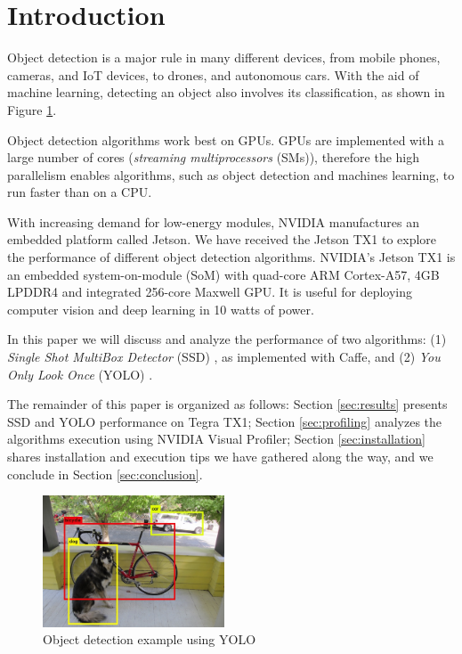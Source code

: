 \section{Introduction}
\label{sec:intro}

Object detection is a major rule in many different devices, from mobile phones, cameras, and IoT devices, to drones, and autonomous cars. With the aid of machine learning, detecting an object also involves its classification, as shown in Figure \ref{fig:detection_example}.

Object detection algorithms work best on GPUs. GPUs are implemented with a large number of cores (\textit{streaming multiprocessors} (SMs)), therefore the high parallelism enables algorithms, such as object detection and machines learning, to run faster than on a CPU.

With increasing demand for low-energy modules, NVIDIA manufactures an embedded platform called Jetson. We have received the Jetson TX1 to explore the performance of different object detection algorithms. NVIDIA's Jetson TX1 is an embedded system-on-module (SoM) with quad-core ARM Cortex-A57, 4GB LPDDR4 and integrated 256-core Maxwell GPU. It is useful for deploying computer vision and deep learning in 10 watts of power.

In this paper we will discuss and analyze the performance of two algorithms: (1) \textit{Single Shot MultiBox Detector} (SSD) \cite{liu2016ssd}, as implemented with Caffe, and (2) \textit{You Only Look Once} (YOLO) \cite{redmon2016you}.

The remainder of this paper is organized as follows: Section \ref{sec:results} presents SSD and YOLO performance on Tegra TX1; Section \ref{sec:profiling} analyzes the algorithms execution using NVIDIA Visual Profiler; Section \ref{sec:installation} shares installation and execution tips we have gathered along the way, and we conclude in Section \ref{sec:conclusion}.

\begin{figure}[t]
	\includegraphics[width=0.48\textwidth]{./imgs/detection_example.png}
	\caption{Object detection example using YOLO}
	\label{fig:detection_example}
\end{figure}
